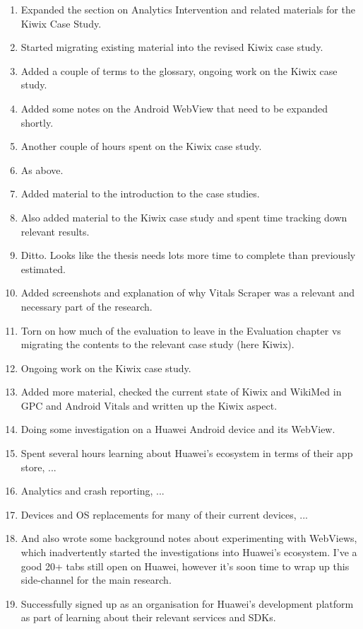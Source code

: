 \begin{enumerate}
    \item Expanded the section on Analytics Intervention and related materials for the Kiwix Case Study.
    \item Started migrating existing material into the revised Kiwix case study.
    \item Added a couple of terms to the glossary, ongoing work on the Kiwix case study.
    \item Added some notes on the Android WebView that need to be expanded shortly.
    \item Another couple of hours spent on the Kiwix case study.
    \item As above.
    \item Added material to the introduction to the case studies.
    \item Also added material to the Kiwix case study and spent time tracking down relevant results.
    \item Ditto. Looks like the thesis needs lots more time to complete than previously estimated.
    \item Added screenshots and explanation of why Vitals Scraper was a relevant and necessary part of the research.
    \item Torn on how much of the evaluation to leave in the Evaluation chapter vs migrating the contents to the relevant case study (here Kiwix).
    \item Ongoing work on the Kiwix case study.
    \item Added more material, checked the current state of Kiwix and WikiMed in GPC and Android Vitals and written up the Kiwix aspect.
    \item Doing some investigation on a Huawei Android device and its WebView.
    \item Spent several hours learning about Huawei's ecosystem in terms of their app store, ...
    \item Analytics and crash reporting, ...
    \item Devices and OS replacements for many of their current devices, ...
    \item And also wrote some background notes about experimenting with WebViews, which inadvertently started the investigations into Huawei's ecosystem. I've a good 20+ tabs still open on Huawei, however it's soon time to wrap up this side-channel for the main research.
    \item Successfully signed up as an organisation for Huawei's development platform as part of learning about their relevant services and SDKs.

\end{enumerate}
